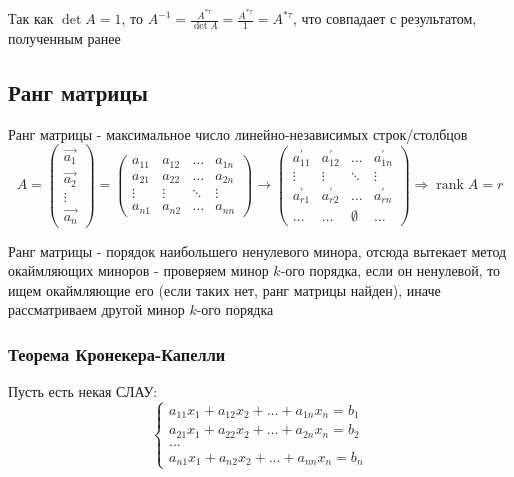 \documentclass[class=article,a4paper,12pt,crop=false]{standalone}
\DeclareMathOperator{\rank}{rank}
\begin{document}
Так как $\det{A} = 1$, то $A^{-1} = \frac{A^{*\tau}}{\det{A}} = \frac{A^{*\tau}}{1} = A^{*\tau}$,
что совпадает с результатом, полученным ранее

\subsection{Ранг матрицы}

Ранг матрицы - максимальное число линейно-независимых строк/столбцов
\begin{equation}
    A = \begin{pmatrix}
        \vec{a_1} \\ \vec{a_2} \\ \vdots \\ \vec{a_n}
    \end{pmatrix} = \begin{pmatrix}
        a_{11} & a_{12} & \dots & a_{1n} \\
        a_{21} & a_{22} & \dots & a_{2n} \\
        \vdots & \vdots & \ddots & \vdots \\
        a_{n1} & a_{n2} & \dots & a_{nn}
    \end{pmatrix} \rightarrow \begin{pmatrix}
        a_{11}^{'} & a_{12}^{'} & \dots & a_{1n}^{'} \\
        \vdots & \vdots & \ddots & \vdots \\
        a_{r1}^{'} & a_{r2}^{'} & \dots & a_{rn}^{'} \\
        \dots & \dots & \emptyset & \dots
    \end{pmatrix} \Rightarrow \rank{A} = r
\end{equation}

Ранг матрицы - порядок наибольшего ненулевого минора, отсюда вытекает метод
окаймляющих миноров - проверяем минор $k$-ого порядка, если он ненулевой, то
ищем окаймляющие его (если таких нет, ранг матрицы найден), иначе рассматриваем
другой минор $k$-ого порядка

\subsubsection{Теорема Кронекера-Капелли}

Пусть есть некая СЛАУ:
\begin{equation}
    \begin{cases}
        a_{11}x_1 + a_{12}x_2 + \dots + a_{1n}x_n = b_1 \\
        a_{21}x_1 + a_{22}x_2 + \dots + a_{2n}x_n = b_2 \\
        \dots \\
        a_{n1}x_1 + a_{n2}x_2 + \dots + a_{nn}x_n = b_n 
    \end{cases}
\end{equation}
\end{document}
